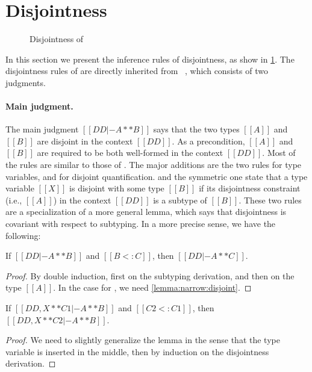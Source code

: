 
\section{Disjointness}
\label{sec:disjoint:fi}


\begin{figure}[t]
  \centering
  \caption{Disjointness of \fnamee}
  \label{fig:disjoint:fi}
\end{figure}


In this section we present the inference rules of disjointness, as show in
\cref{fig:disjoint:fi}. The disjointness rules of \fnamee are directly inherited
from \fname~\citep{alpuimdisjoint}, which consists of two judgments.


\paragraph{Main judgment.}

The main judgment $[[DD |- A ** B]]$ says that the two types $[[A]]$ and $[[B]]$
are disjoint in the context $[[DD]]$. As a precondition, $[[A]]$
and $[[B]]$ are required to be both well-formed in the context $[[DD]]$.
Most of the rules are similar to those of
\namee. The major additions are the two rules  for
type variables, and  for disjoint quantification.
 and the symmetric one  state that a type
variable $[[X]]$ is disjoint with some type $[[B]]$ if its
disjointness constraint (i.e., $[[A]]$) in the context $[[DD]]$ is a subtype of
$[[B]]$. These two rules are a specialization of a more general lemma, which
says that disjointness is covariant with respect to subtyping. In a more precise
sense, we have the following:

\begin{lemma} \label{lemma:covariance:disjoint}
  If $[[DD |- A ** B]]$ and $[[B <: C]]$, then $[[DD |- A ** C]]$.
\end{lemma}
\begin{proof}
  By double induction, first on the subtyping derivation, and then on the
  type $[[A]]$. In the case for , we need \cref{lemma:narrow:disjoint}.
\end{proof}

\begin{lemma} \label{lemma:narrow:disjoint}
  If $[[DD, X ** C1 |- A ** B]]$ and $[[C2 <: C1]]$, then $[[DD, X ** C2 |- A ** B]]$.
\end{lemma}
\begin{proof}
  We need to slightly generalize the lemma in the sense that the type variable is inserted
  in the middle, then by induction on the disjointness derivation.
\end{proof}

